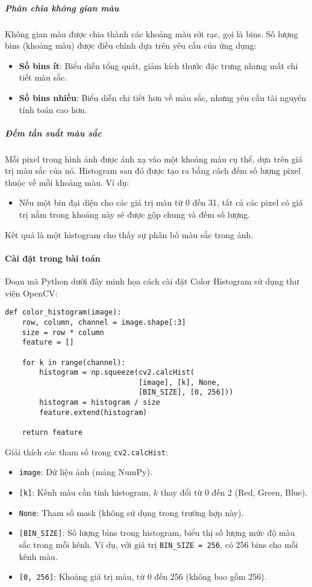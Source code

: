 \documentclass[a4paper,12pt]{article}
\begin{document}
\subparagraph{Phân chia không gian màu}
\hspace{5mm}Không gian màu được chia thành các khoảng màu rời rạc, gọi là bins. Số lượng bins (khoảng màu) được điều chỉnh dựa trên yêu cầu của ứng dụng:
\begin{itemize}
    \item \textbf{Số bins ít}: Biểu diễn tổng quát, giảm kích thước đặc trưng nhưng mất chi tiết màu sắc.
    \item \textbf{Số bins nhiều}: Biểu diễn chi tiết hơn về màu sắc, nhưng yêu cầu tài nguyên tính toán cao hơn.
\end{itemize}

\subparagraph{Đếm tần suất màu sắc}
\hspace{5mm}Mỗi pixel trong hình ảnh được ánh xạ vào một khoảng màu cụ thể, dựa trên giá trị màu sắc của nó. Histogram sau đó được tạo ra bằng cách đếm số lượng pixel thuộc về mỗi khoảng màu. Ví dụ:
\begin{itemize}
    \item Nếu một bin đại diện cho các giá trị màu từ 0 đến 31, tất cả các pixel có giá trị nằm trong khoảng này sẽ được gộp chung và đếm số lượng.
\end{itemize}
\hspace{5mm}Kết quả là một histogram cho thấy sự phân bố màu sắc trong ảnh.

\paragraph{Cài đặt trong bài toán}
\hspace{5mm}Đoạn mã Python dưới đây minh họa cách cài đặt Color Histogram sử dụng thư viện OpenCV:

\begin{verbatim}
def color_histogram(image):
    row, column, channel = image.shape[:3]
    size = row * column
    feature = []

    for k in range(channel):
        histogram = np.squeeze(cv2.calcHist(
                               [image], [k], None, 
                               [BIN_SIZE], [0, 256]))
        histogram = histogram / size
        feature.extend(histogram)

    return feature
\end{verbatim}

\noindent
Giải thích các tham số trong \texttt{cv2.calcHist}:
\begin{itemize}
    \item \texttt{image}: Dữ liệu ảnh (mảng NumPy).
    \item \texttt{[k]}: Kênh màu cần tính histogram, $k$ thay đổi từ 0 đến 2 (Red, Green, Blue).
    \item \texttt{None}: Tham số mask (không sử dụng trong trường hợp này).
    \item \texttt{[BIN\_SIZE]}: Số lượng bins trong histogram, biểu thị số lượng mức độ màu sắc trong mỗi kênh. Ví dụ, với giá trị \texttt{BIN\_SIZE = 256}, có 256 bins cho mỗi kênh màu.
    \item \texttt{[0, 256]}: Khoảng giá trị màu, từ 0 đến 256 (không bao gồm 256).
\end{itemize}
\end{document}
